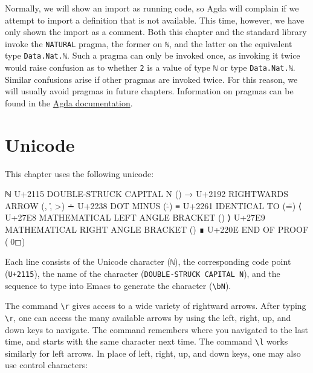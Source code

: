 \begin{fence}
\begin{code}%
\>[0]\<%
\end{code}
\end{fence}

Normally, we will show an import as running code, so Agda will complain
if we attempt to import a definition that is not available. This time,
however, we have only shown the import as a comment. Both this chapter
and the standard library invoke the \texttt{NATURAL} pragma, the former
on \texttt{ℕ}, and the latter on the equivalent type
\texttt{Data.Nat.ℕ}. Such a pragma can only be invoked once, as invoking
it twice would raise confusion as to whether \texttt{2} is a value of
type \texttt{ℕ} or type \texttt{Data.Nat.ℕ}. Similar confusions arise if
other pragmas are invoked twice. For this reason, we will usually avoid
pragmas in future chapters. Information on pragmas can be found in the
\href{https://agda.readthedocs.io/en/v2.6.1/language/pragmas.html}{Agda
documentation}.

\hypertarget{unicode}{%
\section{Unicode}\label{unicode}}

This chapter uses the following unicode:

\begin{myDisplay}
ℕ  U+2115  DOUBLE-STRUCK CAPITAL N (\bN)
→  U+2192  RIGHTWARDS ARROW (\to, \r, \->)
∸  U+2238  DOT MINUS (\.-)
≡  U+2261  IDENTICAL TO (\==)
⟨  U+27E8  MATHEMATICAL LEFT ANGLE BRACKET (\<)
⟩  U+27E9  MATHEMATICAL RIGHT ANGLE BRACKET (\>)
∎  U+220E  END OF PROOF (\qed)
\end{myDisplay}

Each line consists of the Unicode character (\texttt{ℕ}), the
corresponding code point (\texttt{U+2115}), the name of the character
(\texttt{DOUBLE-STRUCK\ CAPITAL\ N}), and the sequence to type into
Emacs to generate the character (\texttt{\textbackslash{}bN}).

The command \texttt{\textbackslash{}r} gives access to a wide variety of
rightward arrows. After typing \texttt{\textbackslash{}r}, one can
access the many available arrows by using the left, right, up, and down
keys to navigate. The command remembers where you navigated to the last
time, and starts with the same character next time. The command
\texttt{\textbackslash{}l} works similarly for left arrows. In place of
left, right, up, and down keys, one may also use control characters:

